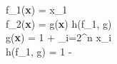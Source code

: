 f_1(\textbf{x}) = x_1 \\
f_2(\textbf{x}) = g(\textbf{x}) h(f_1, g) \\
g(\textbf{x}) = 1 +  \sum_{i=2}^{n} x_i \\
h(f_1, g) = 1 - 
